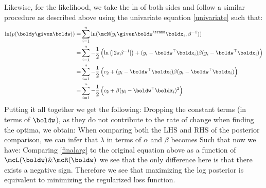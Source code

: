 \documentclass[submit]{harvardml}
\begin{document}
\noindent Likewise, for the likelihood, we take the ln of both sides and follow a similar procedure as described above using the univariate equation \cref{univariate} such that:
\begin{align*}
	\ln(p(\boldy \given \boldw)) =& \sum_{i=1}^n \ln(\mcN(y_i \given \boldw^\trans \boldx_i, \beta^{-1}))\\
	=&\sum_{i=1}^n-{1\over2}\left( \ln\left(|2\pi\beta^{-1}|\right) + (y_i-\boldw^\top\boldx_i)\beta(y_i-\boldw^\top\boldx_i)\right) \\
	=&\sum_{i=1}^n-{1\over2}\left(c_2+(y_i-\boldw^\top\boldx_i)\beta(y_i-\boldw^\top\boldx_i)\right)\\
	=&\sum_{i=1}^n-{1\over2}\left(c_2+\beta(y_i-\boldw^\top\boldx_i)^2\right)
\end{align*}
Putting it all together we get the following:
Dropping the constant terms (in terms of $\boldw$), as they do not contribute to the rate of change when finding the optima, we obtain:
When comparing both the LHS and RHS of the posterior comparison, we can infer that $\lambda$ in terms of  $\alpha$ and $\beta$ becomes
\e{\lambda={\alpha\over\beta}}
Such that now we have:
Comparing \cref{finalarg} to the original equation above as a function of $\mcL(\boldw) \& \mcR(\boldw)$ we see that the only difference here is that there exists a negative sign. Therefore we see that maximizing the log posterior is equivalent to minimizing the regularized loss function. 
\endproof

















\newpage
\end{document}
